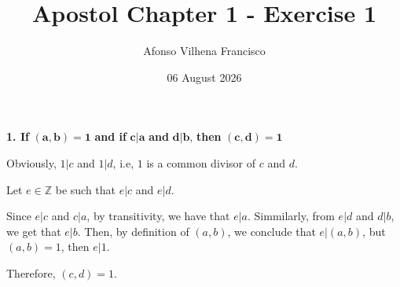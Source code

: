 \documentclass{article}
\title{Apostol Chapter 1 - Exercise 1}
\author{Afonso Vilhena Francisco }
\date{06 August 2026}
\begin{document}
\maketitle

\textbf{1. If} $\mathbf{(a,b)=1}$ \textbf{and if} $\mathbf{c |a}$ \textbf{and} $\mathbf{d|b}$, \textbf{then} $\mathbf{(c,d)=1}$

\vspace{0.5cm}

Obviously, $1|c$ and $1|d$, i.e, $1$ is a common divisor of $c$ and $d$.

Let $e \in \mathbb{Z}$ be such that $e|c$ and $e|d$.

Since $e|c$ and $c|a$, by transitivity, we have that $e|a$.
Simmilarly, from $e|d$ and $d|b$, we get that $e|b$. Then, by definition of $(a,b)$, we conclude that $e|(a,b)$, but $(a,b)=1$, then $e|1$.

Therefore, $(c,d)=1$.
\end{document}
